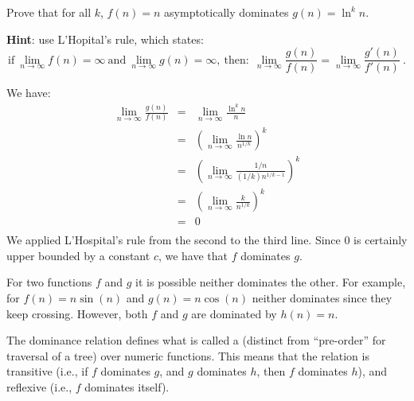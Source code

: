 \begin{flex}

  \begin{exercise}
Prove that for all $k$, $f(n) = n$ asymptotically dominates $g(n) =
\ln^k n$.

\textbf{Hint}: use L'Hopital's
rule, which states:
\[\mbox{if}~
\lim_{n \rightarrow \infty} f(n) = \infty~\mbox{and}~
\lim_{n \rightarrow \infty} g(n) = \infty,~\mbox{then:}~~
\lim_{n \rightarrow \infty} \frac{g(n)}{f(n)} =
\lim_{n \rightarrow \infty} \frac{g'(n)}{f'(n)}~. 
\]
\end{exercise}

\begin{solution}
We have:
\[
\begin{array}{lcl}
\displaystyle\lim_{n \rightarrow \infty} \frac{g(n)}{f(n)}
& = & \displaystyle\lim_{n \rightarrow \infty} \frac{\ln^k n}{n} \\
& = & \left( \displaystyle\lim_{n \rightarrow \infty} \frac{\ln n}{n^{1/k}}
      \right)^k\\ 
& = & \left( \displaystyle\lim_{n \rightarrow \infty} \frac{1/n}{(1/k)
      n^{1/k - 1}}
      \right)^k\\ 
& = & \left( \displaystyle\lim_{n \rightarrow \infty} \frac{k}{n^{1/k}} \right)^k\\ 
& = & 0\\
\end{array}
\]
We applied L'Hospital's rule from the second to the third line.
Since $0$ is certainly upper bounded by a constant $c$, we have that
$f$ dominates $g$.
\end{solution}

\end{flex}

\begin{gram}
For two functions $f$ and $g$ it is possible neither dominates the
other.
For example, for $f(n) = n \sin(n)$ and 
$g(n) = n \cos(n)$ neither dominates since they keep
crossing.
However, both $f$ and $g$ are dominated by $h(n) = n$. 

The dominance relation defines what is called a  (distinct
from ``pre-order'' for traversal of a tree) over numeric
functions.  This means that the relation is transitive (i.e., if $f$ dominates
$g$, and $g$ dominates $h$, then $f$ dominates $h$), and reflexive
(i.e., $f$ dominates itself).
\end{gram}

